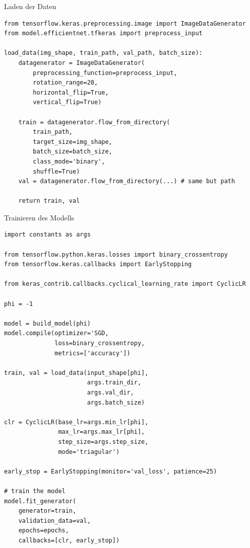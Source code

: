 \begin{code} \label{code:load_data}
\caption{Laden der Daten }
\begin{verbatim}
from tensorflow.keras.preprocessing.image import ImageDataGenerator
from model.efficientnet.tfkeras import preprocess_input

load_data(img_shape, train_path, val_path, batch_size):
	datagenerator = ImageDataGenerator(
		preprocessing_function=preprocess_input,
		rotation_range=20,
		horizontal_flip=True,
		vertical_flip=True)

	train = datagenerator.flow_from_directory(
		train_path,
		target_size=img_shape,
		batch_size=batch_size,
		class_mode='binary',
		shuffle=True)
	val = datagenerator.flow_from_directory(...) # same but path

	return train, val
\end{verbatim}
\end{code}

\begin{code} \label{code:train_efn}
\caption{Trainieren des Modells }
\begin{verbatim}
import constants as args

from tensorflow.python.keras.losses import binary_crossentropy
from tensorflow.keras.callbacks import EarlyStopping

from keras_contrib.callbacks.cyclical_learning_rate import CyclicLR

phi = -1

model = build_model(phi)
model.compile(optimizer='SGD,
			  loss=binary_crossentropy,
			  metrics=['accuracy'])

train, val = load_data(input_shape[phi], 
					   args.train_dir,
					   args.val_dir,
					   args.batch_size)

clr = CyclicLR(base_lr=args.min_lr[phi],
			   max_lr=args.max_lr[phi],
			   step_size=args.step_size,
			   mode='triagular')

early_stop = EarlyStopping(monitor='val_loss', patience=25)

# train the model
model.fit_generator(
	generator=train,
	validation_data=val,
	epochs=epochs,
	callbacks=[clr, early_stop])
\end{verbatim}
\end{code}

